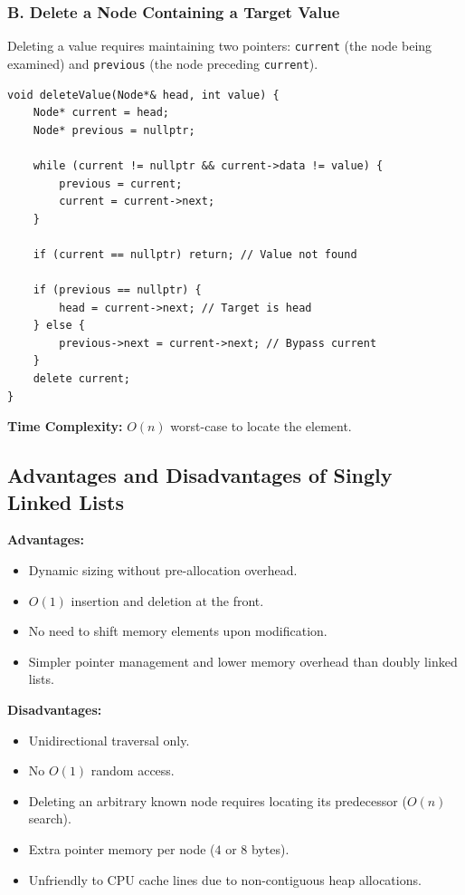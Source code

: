 \subsubsection{B. Delete a Node Containing a Target Value}
Deleting a value requires maintaining two pointers: \texttt{current} (the node being examined) and \texttt{previous} (the node preceding \texttt{current}).

\begin{lstlisting}[style=cppstyle]
void deleteValue(Node*& head, int value) {
    Node* current = head;
    Node* previous = nullptr;

    while (current != nullptr && current->data != value) {
        previous = current;
        current = current->next;
    }

    if (current == nullptr) return; // Value not found

    if (previous == nullptr) {
        head = current->next; // Target is head
    } else {
        previous->next = current->next; // Bypass current
    }
    delete current;
}
\end{lstlisting}

\textbf{Time Complexity:} $O(n)$ worst-case to locate the element.

\subsection{Advantages and Disadvantages of Singly Linked Lists}

\textbf{Advantages:}
\begin{itemize}
    \item Dynamic sizing without pre-allocation overhead.
    \item $O(1)$ insertion and deletion at the front.
    \item No need to shift memory elements upon modification.
    \item Simpler pointer management and lower memory overhead than doubly linked lists.
\end{itemize}

\textbf{Disadvantages:}
\begin{itemize}
    \item Unidirectional traversal only.
    \item No $O(1)$ random access.
    \item Deleting an arbitrary known node requires locating its predecessor ($O(n)$ search).
    \item Extra pointer memory per node ($4$ or $8$ bytes).
    \item Unfriendly to CPU cache lines due to non-contiguous heap allocations.
\end{itemize}

